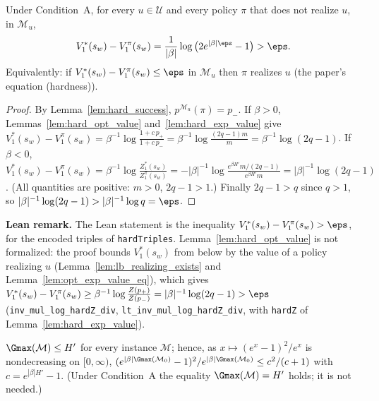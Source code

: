 \begin{lemma}\label{lem:hard_eps_suboptimal}
\leanok
Under Condition~A, for every $u \in \mathcal U$ and every policy $\pi$ that does not realize
$u$, in $\mathcal M_u$,
\[
  V^*_1(s_w) - V^\pi_1(s_w) = \frac{1}{|\beta|}\log\big(2e^{|\beta|\eps} - 1\big) > \eps .
\]
Equivalently: if $V^*_1(s_w) - V^\pi_1(s_w) \le \eps$ in $\mathcal M_u$ then $\pi$ realizes $u$
(the paper's equation (hardness)).
\end{lemma}

\begin{proof}
\leanok
{}
By Lemma~\ref{lem:hard_success}, $p^{\mathcal M_u}(\pi) = p_-$. If $\beta > 0$,
Lemmas~\ref{lem:hard_opt_value} and~\ref{lem:hard_exp_value} give
$V^*_1(s_w) - V^\pi_1(s_w) = \beta^{-1}\log\frac{1 + c\,p_+}{1 + c\,p_-} = \beta^{-1}\log\frac{(2q-1)m}{m} = \beta^{-1}\log(2q-1)$.
If $\beta < 0$, $V^*_1(s_w) - V^\pi_1(s_w) = \beta^{-1}\log\frac{Z^*_1(s_w)}{Z^\pi_1(s_w)}
= -|\beta|^{-1}\log\frac{e^{\beta H'} m/(2q-1)}{e^{\beta H'} m} = |\beta|^{-1}\log(2q-1)$.
(All quantities are positive: $m > 0$, $2q - 1 > 1$.) Finally $2q - 1 > q$ since $q > 1$, so
$|\beta|^{-1}\log(2q-1) > |\beta|^{-1}\log q = \eps$.
\end{proof}

\textbf{Lean remark.} The Lean statement is the inequality $V^*_1(s_w) - V^\pi_1(s_w) > \eps$, for the encoded
triples of \texttt{hardTriples}. Lemma~\ref{lem:hard_opt_value} is not formalized: the proof bounds
$V^*_1(s_w)$ from below by the value of a policy realizing $u$ (Lemma~\ref{lem:lb_realizing_exists} and
Lemma~\ref{lem:opt_exp_value_eq}), which gives
$V^*_1(s_w) - V^\pi_1(s_w) \ge \beta^{-1}\log\frac{Z(p_+)}{Z(p_-)} = |\beta|^{-1}\log(2q - 1) > \eps$
(\texttt{inv\_mul\_log\_hardZ\_div}, \texttt{lt\_inv\_mul\_log\_hardZ\_div}, with \texttt{hardZ} of
Lemma~\ref{lem:hard_exp_value}).

\begin{lemma}\label{lem:hard_gmax}
\leanok
$\Gmax(\mathcal M) \le H'$ for every instance $\mathcal M$; hence, as $x \mapsto (e^x - 1)^2/e^x$ is
nondecreasing on $[0, \infty)$,
$(e^{|\beta|\Gmax(\mathcal M_0)} - 1)^2/e^{|\beta|\Gmax(\mathcal M_0)} \le c^2/(c+1)$ with $c = e^{|\beta|H'} - 1$.
(Under Condition~A the equality $\Gmax(\mathcal M) = H'$ holds; it is not needed.)
\end{lemma}

